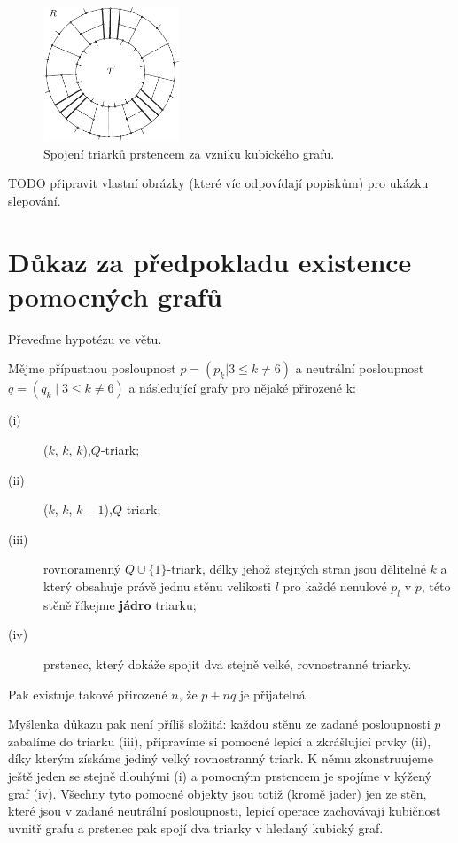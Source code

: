 \begin{figure}[h!]\centering
\includegraphics[height=40mm]{../img/T-G}
\caption{Spojení triarků prstencem za vzniku kubického grafu.}
\label{obr23:T-G}
\end{figure}

TODO připravit vlastní obrázky (které víc odpovídají popiskům) pro ukázku slepování.


\section{Důkaz za předpokladu existence pomocných grafů}
Převeďme hypotézu ve větu.

\begin{veta}\label{veta02:2}
Mějme přípustnou posloupnost $p=(p_k | 3 \leq k \neq 6)$ a neutrální posloupnost $q=(q_k \mid 3 \leq k \neq 6)$ a následující grafy pro nějaké přirozené k:
\begin{description}
\item[(i)] ($k$, $k$, $k$),$Q$-triark;
\item[(ii)] ($k$, $k$, $k-1$),$Q$-triark;
\item[(iii)] rovnoramenný $Q\cup \lbrace1\rbrace$-triark, délky jehož stejných stran jsou dělitelné $k$ a který obsahuje právě jednu stěnu velikosti $l$ pro každé nenulové $p_l$ v $p$, této stěně říkejme \textbf{jádro} triarku;
\item[(iv)] prstenec, který dokáže spojit dva stejně velké, rovnostranné triarky.
\end{description}

Pak existuje takové přirozené $n$, že $p+nq$ je přijatelná.
\end{veta}


Myšlenka důkazu pak není příliš složitá: každou stěnu ze zadané posloupnosti $p$ zabalíme do triarku (iii), připravíme si pomocné lepící a zkrášlující prvky (ii), díky kterým získáme jediný velký rovnostranný triark. K němu zkonstruujeme ještě jeden se stejně dlouhými (i) a pomocným prstencem je spojíme v kýžený graf (iv). Všechny tyto pomocné objekty jsou totiž (kromě jader) jen ze stěn, které jsou v zadané neutrální posloupnosti, lepicí operace zachovávají kubičnost uvnitř grafu a prstenec pak spojí dva triarky v hledaný kubický graf.

